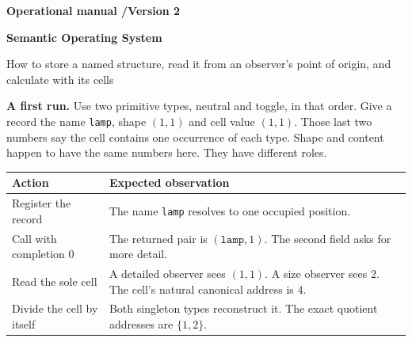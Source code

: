 \documentclass[11pt,a4paper]{article}
\newcommand{\EditionPart}{Formal discussion}
\newcommand{\kicker}[1]{{\sffamily\bfseries\small\color{tealref}#1\par}}
\newcommand{\edtitle}[1]{{\sffamily\bfseries\fontsize{24}{27}\selectfont\color{ink}#1\par}}
\newcommand{\manualtarget}[1]{\hypertarget{#1}{}\label{loc-#1}}
\begin{document}
\color{ink}
\ifdefined\SosManualEdition
{}
\manualtarget{start}
\renewcommand{\EditionPart}{Operational manual}
\kicker{Operational manual \enspace/\enspace Version 2}
\edtitle{Semantic Operating System}
{\large How to store a named structure, read it from an observer's point of origin, and calculate with its cells\par}
\medskip
\textbf{A first run.} Use two primitive types, neutral and toggle, in that order. Give a record the name \texttt{lamp}, shape $(1,1)$ and cell value $(1,1)$. Those last two numbers say the cell contains one occurrence of each type. Shape and content happen to have the same numbers here. They have different roles.

\begin{tabular}{@{}p{.29\linewidth}p{.63\linewidth}@{}}
\toprule
\textbf{Action} & \textbf{Expected observation}\\
\midrule
Register the record & The name \texttt{lamp} resolves to one occupied position.\\
Call with completion $0$ & The returned pair is $(\texttt{lamp},1)$. The second field asks for more detail.\\
Read the sole cell & A detailed observer sees $(1,1)$. A size observer sees $2$. The cell's natural canonical address is $4$.\\
Divide the cell by itself & Both singleton types reconstruct it. The exact quotient addresses are $\{1,2\}$.\\
\bottomrule
\end{tabular}
\end{document}
